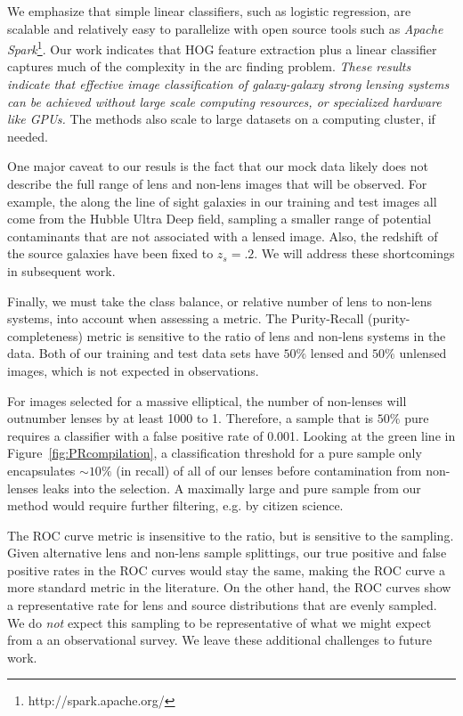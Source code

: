\documentclass{emulateapj}
\begin{document}
We emphasize that simple linear classifiers, such as logistic
regression, are scalable and relatively easy to parallelize with open
source tools such as {\em Apache Spark}\footnote{http://spark.apache.org/}.
Our work indicates that HOG feature extraction plus a linear
classifier captures much of the complexity in the arc finding problem.
{\it These results indicate that effective image classification of
  galaxy-galaxy strong lensing systems can be achieved without large
  scale computing resources, or specialized hardware like GPUs.}
The methods also scale to large datasets on a computing cluster, if
needed.

One major caveat to our resuls is the fact that our mock data likely
does not describe the full range of lens and non-lens images that will
be observed.  For example, the along the line of sight galaxies in our
training and test images all come from the Hubble Ultra Deep field,
sampling a smaller range of potential contaminants that are not
associated with a lensed image.  Also, the redshift of the source
galaxies have been fixed to $z_s=.2$.  We will address these
shortcomings in subsequent work.

Finally, we must take the class balance, or relative number of lens to
non-lens systems, into account when assessing a metric.  The
Purity-Recall (purity-completeness) metric is sensitive to the ratio
of lens and non-lens systems in the data.  Both of our training and
test data sets have $50\%$ lensed and $50\%$ unlensed images, which is
not expected in observations.  

For images selected for a massive elliptical, the number of non-lenses
will outnumber lenses by at least 1000 to 1.  Therefore, a sample that
is $50\%$ pure requires a classifier with a false positive rate of
0.001.  Looking at the green line in Figure~\ref{fig:PRcompilation}, a
classification threshold for a pure sample only encapsulates
$\sim10\%$ (in recall) of all of our lenses before contamination from
non-lenses leaks into the selection.  A maximally large and pure
sample from our method would require further filtering, e.g. by
citizen science.

The ROC curve metric is insensitive to the ratio, but is sensitive to
the sampling.  Given alternative lens and non-lens sample splittings,
our true positive and false positive rates in the ROC curves would
stay the same, making the ROC curve a more standard metric in the
literature.  On the other hand, the ROC curves show a representative
rate for lens and source distributions that are evenly sampled.  We do
{\it not} expect this sampling to be representative of what we might
expect from a an observational survey.  We leave these additional
challenges to future work.
\end{document}
